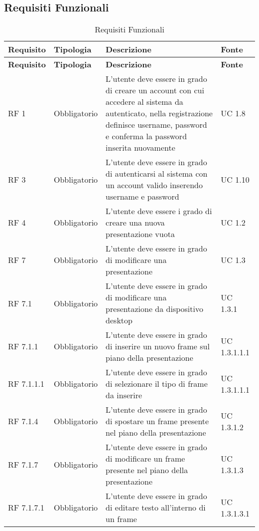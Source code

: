 \subsection{Requisiti Funzionali}{
		\renewcommand*{\arraystretch}{1.4}
		\begin{longtable} [c]{| p{2.5cm} | p{2.5cm} | p{6cm} |p{2.5cm}|}
			\caption{Requisiti Funzionali \label{tab:reqFunzionali}}\\
			 \hline
			 \textbf{Requisito} & \textbf{Tipologia} & \textbf{Descrizione} & \textbf{Fonte} \\
			 \hline
			 \endfirsthead
			 \hline
			 \textbf{Requisito} & \textbf{Tipologia} & \textbf{Descrizione} & \textbf{Fonte} \\
			 \hline
				\endhead
			 \hline
			 \endfoot
			 \hline
			 \endlastfoot
			RF 1 & Obbligatorio & L'utente deve essere in grado di creare un account con cui accedere al sistema da autenticato, nella registrazione definisce username, password e conferma la password inserita nuovamente & UC 1.8\\
			\hline
			RF 3 & Obbligatorio & L'utente deve essere in grado di autenticarsi al sistema con un account valido inserendo username e password & UC 1.10\\
			\hline
			RF 4 & Obbligatorio & L’utente deve essere i grado di creare una nuova presentazione vuota & UC 1.2\\
			\hline	
			RF 7 & Obbligatorio & L'utente deve essere in grado di modificare una presentazione & UC 1.3\\
			\hline
			RF 7.1 & Obbligatorio & L'utente deve essere in grado di modificare una presentazione da dispositivo desktop & UC 1.3.1\\						
			\hline
			RF 7.1.1 & Obbligatorio & L'utente deve essere in grado di inserire un nuovo frame sul piano della presentazione & UC 1.3.1.1.1\\
			\hline
			RF 7.1.1.1 & Obbligatorio & L'utente deve essere in grado di selezionare il tipo di frame da inserire & UC 1.3.1.1.1\\
			\hline
			RF 7.1.4 & Obbligatorio & L'utente deve essere in grado di spostare un frame presente nel piano della presentazione & UC 1.3.1.2\\
			\hline
			RF 7.1.7 & Obbligatorio & L'utente deve essere in grado di modificare un frame presente nel piano della presentazione & UC 1.3.1.3\\
			\hline
			RF 7.1.7.1 & Obbligatorio & L'utente deve essere in grado di editare testo all'interno di un frame & UC 1.3.1.3.1\\

\end{longtable}}
